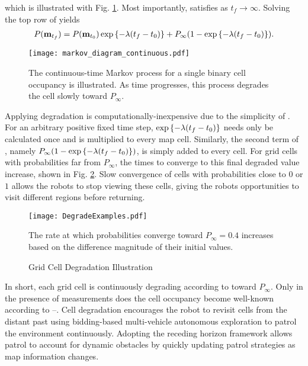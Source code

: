 which is illustrated with Fig. \ref{fig:MarkovDegradeContinuous}. Most importantly,  satisfies  as $t_f\rightarrow\infty$. Solving the top row of  yields
\begin{align}
\label{eqn:CellDegradationScalar}
P(\mathbf{m}_{t_f})=P(\mathbf{m}_{t_0})\exp\left\{ -\lambda (t_f-t_0) \right\}+P_\infty(1-\exp\left\{ -\lambda (t_f-t_0) \right\}).
\end{align}

\begin{figure}
\centering
\texttt{[image: markov\_diagram\_continuous.pdf]}
\caption{The continuous-time Markov process for a single binary cell occupancy is illustrated. As time progresses, this process degrades the cell slowly toward $P_\infty.$}
\label{fig:MarkovDegradeContinuous}
\end{figure}

Applying degradation is computationally-inexpensive due to the simplicity of . For an arbitrary positive fixed time step, $\exp\left\{ -\lambda (t_f-t_0) \right\}$ needs only be calculated once and is multiplied to every map cell. Similarly, the second term of , namely $P_\infty(1-\exp\left\{ -\lambda (t_f-t_0) \right\})$, is simply added to every cell. For grid cells with probabilities far from $P_\infty$, the times to converge to this final degraded value increase, shown in Fig. \ref{fig:DegradeExamples}. Slow convergence of cells with probabilities close to $0$ or $1$ allows the robots to stop viewing these cells, giving the robots opportunities to visit different regions before returning.

\begin{figure}
	\centering
	\texttt{[image: DegradeExamples.pdf]}
	\caption{Grid Cell Degradation Illustration}
	\medskip
	\small
	The rate at which probabilities converge toward $P_\infty=0.4$ increases based on the difference magnitude of their initial values.
	\label{fig:DegradeExamples}
\end{figure}

In short, each grid cell is continuously degrading according to  toward $P_\infty$. Only in the presence of measurements does the cell occupancy become well-known according to --. Cell degradation encourages the robot to revisit cells from the distant past using bidding-based multi-vehicle autonomous exploration to patrol the environment continuously. Adopting the receding horizon framework allows patrol to account for dynamic obstacles by quickly updating patrol strategies as map information changes.


